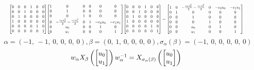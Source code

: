 \documentclass[11pt]{article}
\theoremstyle{definition}
\begin{document}
\[
\scaletoalign{\textwidth}{{\left[\begin{matrix}0 & 0 & 0 & 1 & 0 & 0\\0 & 0 & 1 & 0 & 0 & 0\\0 & 1 & 0 & 0 & 0 & 0\\1 & 0 & 0 & 0 & 0 & 0\\0 & 0 & 0 & 0 & 1 & 0\\0 & 0 & 0 & 0 & 0 & 1\end{matrix}\right]} {\left[\begin{matrix}1 & 0 & 0 & 0 & 0 & 0\\0 & 1 & 0 & 0 & 0 & 0\\0 & 0 & 1 & 0 & 0 & 0\\0 & - \frac{c_{0} u_{0}^{2}}{2} - \frac{c_{1} u_{1}^{2}}{2} & 0 & 1 & - c_{0} u_{0} & - c_{1} u_{1}\\0 & u_{0} & 0 & 0 & 1 & 0\\0 & u_{1} & 0 & 0 & 0 & 1\end{matrix}\right]} {\left[\begin{matrix}0 & 0 & 0 & 1 & 0 & 0\\0 & 0 & 1 & 0 & 0 & 0\\0 & 1 & 0 & 0 & 0 & 0\\1 & 0 & 0 & 0 & 0 & 0\\0 & 0 & 0 & 0 & 1 & 0\\0 & 0 & 0 & 0 & 0 & 1\end{matrix}\right]} = {\left[\begin{matrix}1 & 0 & - \frac{c_{0} u_{0}^{2}}{2} - \frac{c_{1} u_{1}^{2}}{2} & 0 & - c_{0} u_{0} & - c_{1} u_{1}\\0 & 1 & 0 & 0 & 0 & 0\\0 & 0 & 1 & 0 & 0 & 0\\0 & 0 & 0 & 1 & 0 & 0\\0 & 0 & u_{0} & 0 & 1 & 0\\0 & 0 & u_{1} & 0 & 0 & 1\end{matrix}\right]}}
\]
\[
\alpha = \left( -1, \  -1, \  0, \  0, \  0, \  0\right), \beta = \left( 0, \  1, \  0, \  0, \  0, \  0\right), \sigma_{\alpha}(\beta) = \left( -1, \  0, \  0, \  0, \  0, \  0\right)
\]
\[
\scaletoalign{\textwidth}{w_{\alpha} X_{\beta}\left(\left[\begin{matrix}u_{0}\\u_{1}\end{matrix}\right]\right) w_{\alpha}^{-1} = X_{\sigma_{\alpha}\left(\beta\right)}\left(\left[\begin{matrix}u_{0}\\u_{1}\end{matrix}\right]\right)}
\]
\end{document}
